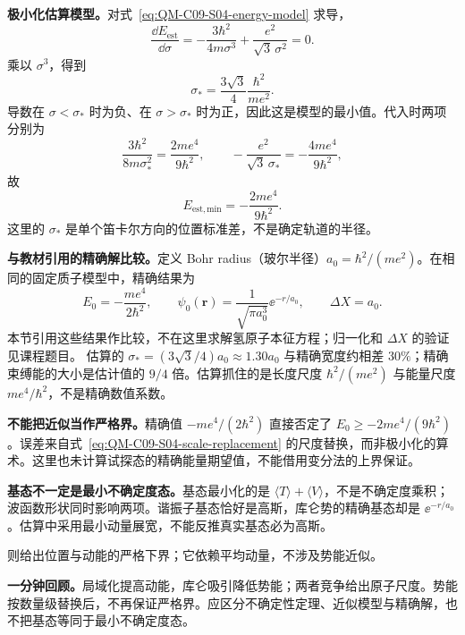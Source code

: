 \textbf{极小化估算模型。}对式~\eqref{eq:QM-C09-S04-energy-model} 求导，
\begin{equation}
  \frac{\dd E_{\mathrm{est}}}{\dd\sigma}
   =-\frac{3\hbar^2}{4m\sigma^3}
     +\frac{e^2}{\sqrt3\,\sigma^2}=0.
\end{equation}
乘以 $\sigma^3$，得到
\begin{equation}
  \boxed{\sigma_* =\frac{3\sqrt3}{4}\frac{\hbar^2}{me^2}}.
\end{equation}
导数在 $\sigma<\sigma_*$ 时为负、在 $\sigma>\sigma_*$ 时为正，因此这是模型的最小值。代入时两项分别为
\begin{equation}
  \frac{3\hbar^2}{8m\sigma_*^2}=\frac{2me^4}{9\hbar^2},
  \qquad -\frac{e^2}{\sqrt3\,\sigma_*}=-\frac{4me^4}{9\hbar^2},
\end{equation}
故
\begin{equation}
  \boxed{E_{\mathrm{est,min}}=-\frac{2me^4}{9\hbar^2}}.
\end{equation}
这里的 $\sigma_*$ 是单个笛卡尔方向的位置标准差，不是确定轨道的半径。

\textbf{与教材引用的精确解比较。}定义 Bohr radius（玻尔半径）$a_0=\hbar^2/(me^2)$。在相同的固定质子模型中，精确结果为
\begin{equation}
  E_0=-\frac{me^4}{2\hbar^2},\qquad
  \psi_0(\mathbf r)=\frac1{\sqrt{\pi a_0^3}}\ee^{-r/a_0},
  \qquad \Delta X=a_0.
\end{equation}
本节引用这些结果作比较，不在这里求解氢原子本征方程；归一化和 $\Delta X$ 的验证见课程题目。
估算的 $\sigma_*=(3\sqrt3/4)a_0\approx1.30a_0$ 与精确宽度约相差 $30\%$；精确束缚能的大小是估计值的 $9/4$ 倍。估算抓住的是长度尺度 $\hbar^2/(me^2)$ 与能量尺度 $me^4/\hbar^2$，不是精确数值系数。

\textbf{不能把近似当作严格界。}精确值 $-me^4/(2\hbar^2)$ 直接否定了 $E_0\ge-2me^4/(9\hbar^2)$。误差来自式~\eqref{eq:QM-C09-S04-scale-replacement} 的尺度替换，而非极小化的算术。这里也未计算试探态的精确能量期望值，不能借用变分法的上界保证。

\textbf{基态不一定是最小不确定度态。}基态最小化的是 $\langle T\rangle+\langle V\rangle$，不是不确定度乘积；波函数形状同时影响两项。谐振子基态恰好是高斯，库仑势的精确基态却是 $\ee^{-r/a_0}$。估算中采用最小动量展宽，不能反推真实基态必为高斯。

 则给出位置与动能的严格下界；它依赖平均动量，不涉及势能近似。

\textbf{一分钟回顾。}局域化提高动能，库仑吸引降低势能；两者竞争给出原子尺度。势能按数量级替换后，不再保证严格界。应区分不确定性定理、近似模型与精确解，也不把基态等同于最小不确定度态。

